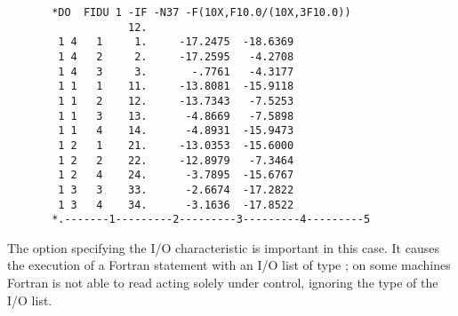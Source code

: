 \begin{verbatim}
       *DO  FIDU 1 -IF -N37 -F(10X,F10.0/(10X,3F10.0))
                   12.
        1 4   1     1.     -17.2475  -18.6369
        1 4   2     2.     -17.2595   -4.2708
        1 4   3     3.       -.7761   -4.3177
        1 1   1    11.     -13.8081  -15.9118
        1 1   2    12.     -13.7343   -7.5253
        1 1   3    13.      -4.8669   -7.5898
        1 1   4    14.      -4.8931  -15.9473
        1 2   1    21.     -13.0353  -15.6000
        1 2   2    22.     -12.8979   -7.3464
        1 2   4    24.      -3.7895  -15.6767
        1 3   3    33.      -2.6674  -17.2822
        1 3   4    34.      -3.1636  -17.8522
       *.-------1---------2---------3---------4---------5
\end{verbatim}

The option  specifying the I/O characteristic
is important in this case.
It causes the execution of a Fortran  statement with an I/O list
of type ;
on some machines Fortran is not able to read acting solely under
 control, ignoring the type of the I/O list.
